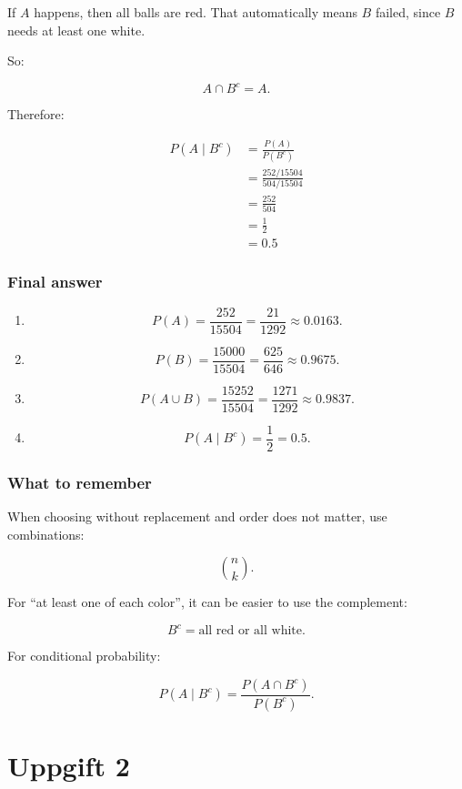 \documentclass[10pt]{article}
\begin{document}
If $A$ happens, then all balls are red.
That automatically means $B$ failed, since $B$ needs at least
one white.

So:

\[
A\cap B^c=A.
\]

Therefore:

\begin{align*}
P(A\mid B^c)
&=
\frac{P(A)}{P(B^c)} \\[2mm]
&=
\frac{252/15504}{504/15504} \\[2mm]
&=
\frac{252}{504} \\[2mm]
&=
\frac{1}{2} \\[2mm]
&=0.5
\end{align*}

\subsubsection*{Final answer}
\begin{enumerate}[label=\alph*)]
\item
\[
P(A)=\frac{252}{15504}
=\frac{21}{1292}
\approx 0.0163.
\]

\item
\[
P(B)=\frac{15000}{15504}
=\frac{625}{646}
\approx 0.9675.
\]

\item
\[
P(A\cup B)
=\frac{15252}{15504}
=\frac{1271}{1292}
\approx 0.9837.
\]

\item
\[
P(A\mid B^c)=\frac{1}{2}=0.5.
\]
\end{enumerate}

\subsubsection*{What to remember}
When choosing without replacement and order does not matter,
use combinations:

\[
\binom{n}{k}.
\]

For ``at least one of each color'', it can be easier to use
the complement:

\[
B^c=\text{all red or all white}.
\]

For conditional probability:

\[
P(A\mid B^c)
=
\frac{P(A\cap B^c)}{P(B^c)}.
\]

\section*{Uppgift 2}
\end{document}
